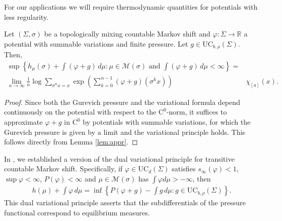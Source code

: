 \documentclass[letterpaper,11pt]{amsart}
\numberwithin{equation}{section}     %
\newcommand{\M}{\mathcal{M}}
\newcommand{\R}{\mathbb{R}}
\def\phi{\varphi}
\def\R{{\mathbb R}}
\def\M{{\mathcal M}}
\def\M{\mathcal{M}}
\begin{document}
For our applications we will require thermodynamic quantities for potentials with less regularity.




\begin{lemma}\label{lem:c0} Let $(\Sigma,\sigma)$ be a topologically mixing countable Markov shift and $\phi:\Sigma\to\R$  a potential with summable variations and finite pressure. Let $g\in \mathrm{UC}_{b,\rho}(\Sigma)$. Then, 
\begin{align*}
\sup \left\{	h_{\mu}(\sigma)  + \int (\phi +g) \, d\mu : \mu \in \M(\sigma) \text{ and }\int (\phi +g) \, d\mu  <\infty		\right\} = &\\ \lim_{n \to \infty} \frac{1}{n} \log \sum_{\sigma^nx=x}\exp \left(\sum_{k=0}^{n-1} (\phi+g) (\sigma^{k}x)\right) &\chi_{[a]}(x). 
\end{align*}
\end{lemma}


\begin{proof} Since both the Gurevich pressure and the variational formula depend continuously on the potential with respect to the $\text{C}^0$-norm, it suffices to approximate $\phi+g$ in $\text{C}^0$ by potentials with summable variations, for which the Gurevich pressure is given by a limit and the variational principle holds. This follows directly from Lemma \ref{lem:appr}.
\end{proof}

In \cite[Theorem 1.4 and Remark 6.1]{iv2},  we established a version of the dual variational principle for transitive countable Markov shift. Specifically, if $\phi\in\mathrm{UC}_d(\Sigma)$ satisfies $s_\infty(\phi)<1$, $\sup \phi <\infty$, $P(\phi)<\infty$ and $\mu \in \M(\sigma)$ has $\int \phi d\mu>-\infty$, then
\begin{align}\label{ref:dualvarprin}
h(\mu) + \int \phi \, d \mu = \inf \left\{P(\phi+g) - 	\int g \, d \mu : g \in \mathrm{UC}_{b,\rho}(\Sigma)	\right\}.
\end{align}
This dual variational principle asserts  that the subdifferentials of the pressure functional correspond to equilibrium measures.
\end{document}
